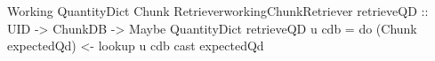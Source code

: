 \begin{pseudohaskell}{Working QuantityDict Chunk Retriever}{workingChunkRetriever}
retrieveQD :: UID -> ChunkDB -> Maybe QuantityDict
retrieveQD u cdb = do
    (Chunk expectedQd) <- lookup u cdb
    cast expectedQd
\end{pseudohaskell}
